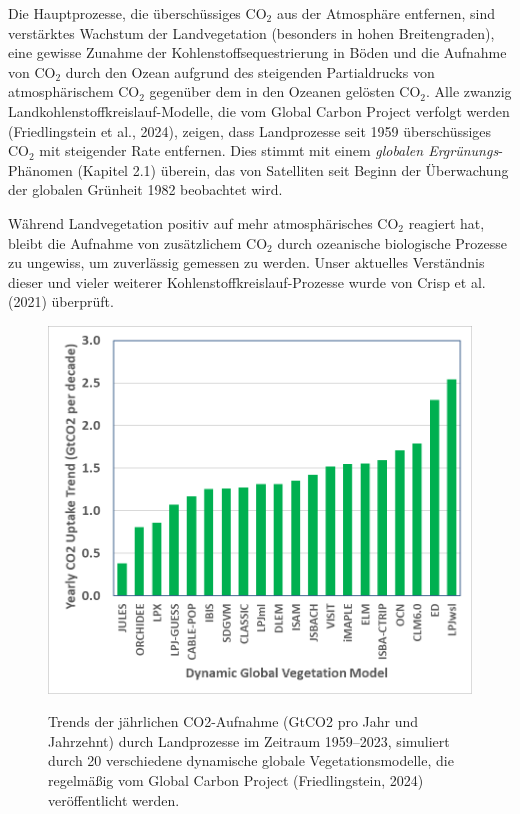 \documentclass[12pt,paper=a4,DIV=12,parskip=never,chapterprefix=false,headings=standardclasses]{scrreprt}
\begin{document}
Die Hauptprozesse, die überschüssiges CO$_2$ aus der Atmosphäre entfernen, sind verstärktes Wachstum der Landvegetation (besonders in hohen Breitengraden), eine gewisse Zunahme der Kohlenstoffsequestrierung in Böden und die Aufnahme von CO$_2$ durch den Ozean aufgrund des steigenden Partialdrucks von atmosphärischem CO$_2$ gegenüber dem in den Ozeanen gelösten CO$_2$. Alle zwanzig Landkohlenstoffkreislauf-Modelle, die vom Global Carbon Project verfolgt werden (Friedlingstein et al., 2024), zeigen, dass Landprozesse seit 1959 überschüssiges CO$_2$ mit steigender Rate entfernen. Dies stimmt mit einem \emph{globalen Ergrünungs}-Phänomen (Kapitel 2.1) überein, das von Satelliten seit Beginn der Überwachung der globalen Grünheit 1982 beobachtet wird.

Während Landvegetation positiv auf mehr atmosphärisches CO$_2$ reagiert hat, bleibt die Aufnahme von zusätzlichem CO$_2$ durch ozeanische biologische Prozesse zu ungewiss, um zuverlässig gemessen zu werden. Unser aktuelles Verständnis dieser und vieler weiterer Kohlenstoffkreislauf-Prozesse wurde von Crisp et al. (2021) überprüft.

\begin{figure}[H]
\begin{center}
\includegraphics[width=1.0\textwidth]{bilder/bilderKlima-0013.png}\\[1cm]
\end{center}
\caption{Trends der jährlichen CO2-Aufnahme (GtCO2 pro Jahr und Jahrzehnt) durch Landprozesse
im Zeitraum 1959–2023, simuliert durch 20 verschiedene dynamische globale Vegetationsmodelle, die regelmäßig
vom Global Carbon Project (Friedlingstein, 2024) veröffentlicht werden.}
\end{figure}
\end{document}
